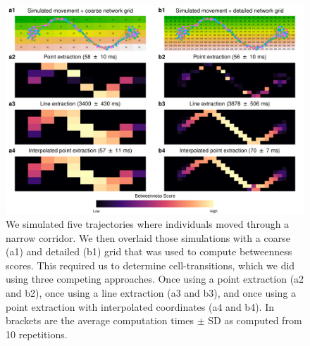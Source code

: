 \documentclass[abstract=off,10pt,a4paper,bibliography=totocnumbered]{article}
\begin{document}
\begin{figure}[htbp]
 \begin{center}
  \includegraphics[width = \textwidth]{99_BetweennessApproaches.png}
  \caption{We simulated five trajectories where individuals moved through a
  narrow corridor. We then overlaid those simulations with a coarse (a1) and
  detailed (b1) grid that was used to compute betweenness scores. This required
  us to determine cell-transitions, which we did using three competing
  approaches. Once using a point extraction (a2 and b2), once using a line
  extraction (a3 and b3), and once using a point extraction with interpolated
  coordinates (a4 and b4). In brackets are the average computation times $\pm$
  SD as computed from 10 repetitions.}
  \label{BetweennessApproaches}
 \end{center}
\end{figure}
\end{document}
